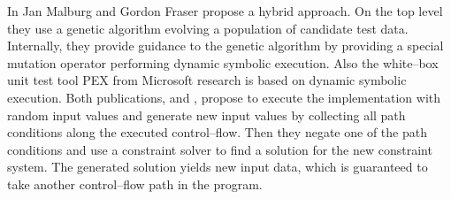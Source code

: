 \documentclass[runningheads,a4paper]{llncs}%
\begin{document}
In \cite{malburg2011combining} Jan Malburg and Gordon Fraser propose a hybrid approach. On the top level they use a genetic algorithm evolving a population of candidate test data. Internally, they provide guidance to the genetic algorithm by providing a special mutation operator performing dynamic symbolic execution. Also the white--box unit test tool PEX \cite{pex} from Microsoft\textsuperscript{\textregistered} research is based on dynamic symbolic execution. Both publications, \cite{malburg2011combining} and \cite{pex}, propose to execute the implementation with random input values and generate new input values by collecting all path conditions along the executed control--flow. Then they negate one of the path conditions and use a constraint solver to find a solution for the new constraint system. The generated solution yields new input data, which is guaranteed to take another control--flow path in the program.\\%
\end{document}
